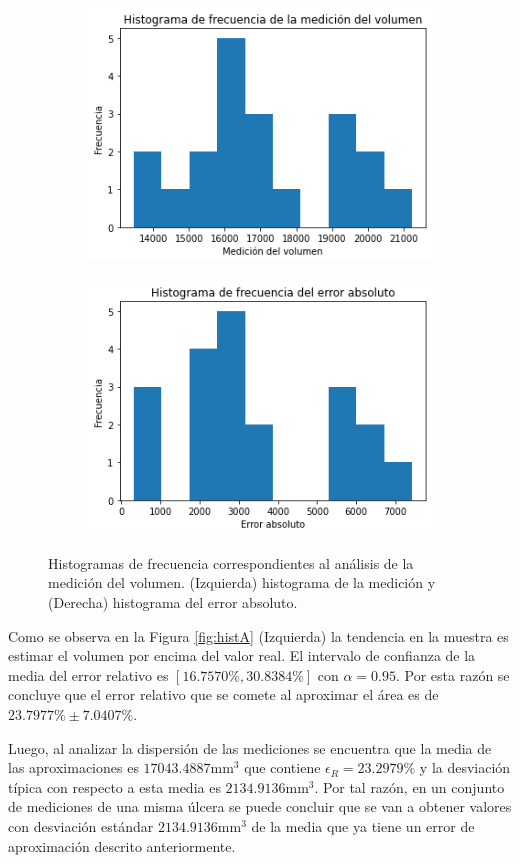 \begin{figure}[ht]
	\centering
	\begin{subfigure}
		\centering
		\includegraphics[width=.49\linewidth]{./Graphics/histV.png}
	\end{subfigure}
	\begin{subfigure}
		\centering
		\includegraphics[width=.49\linewidth]{./Graphics/histVEA.png}
	\end{subfigure}
	\caption{Histogramas de frecuencia correspondientes al análisis de la medición del volumen. (Izquierda) histograma de la medición y (Derecha) histograma del error absoluto.}
	\label{fig:histV}
\end{figure}

Como se observa en la Figura \ref{fig:histA} (Izquierda) la tendencia en la muestra es estimar el volumen por encima del valor real. El intervalo de confianza de la media del error relativo es $[16.7570\%, 30.8384\%]$ con $\alpha =0.95$. Por esta razón se concluye que el error relativo que se comete al aproximar el área es de $23.7977\% \pm 7.0407\%$. 

Luego, al analizar la dispersión de las mediciones se encuentra que la media de las aproximaciones es $17043.4887\text{mm}^3$ que contiene $\epsilon_R=23.2979\%$ y la desviación típica con respecto a esta media es $2134.9136\text{mm}^3$. Por tal razón, en un conjunto de mediciones de una misma úlcera se puede concluir que se van a obtener valores con desviación estándar $2134.9136\text{mm}^3$ de la media que ya tiene un error de aproximación descrito anteriormente.


